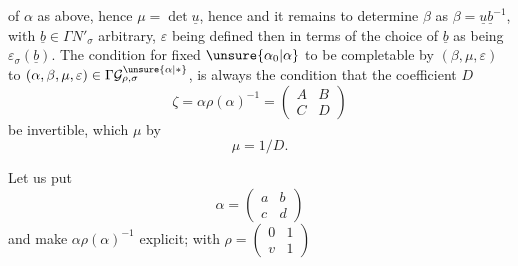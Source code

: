 of $\alpha$ as above, hence $\mu=\det\underline u$, hence
and it  
remains to determine $\beta$ as
$\beta=\underline u\underline b^{-1}$, with $\underline b\in\Gamma N'_\sigma$
arbitrary, $\varepsilon$ being defined then in terms of the choice of $\underline b$
as being $\varepsilon_\sigma(\underline b)$. The condition for
fixed $\unsure{\alpha_0|\alpha}$ to be completable by $(\beta,\mu,\varepsilon)$
to $(\alpha,\beta,\mu,\varepsilon)\in\Gamma\mathcal G^{\unsure{\alpha|*}}_{\rho,\sigma}$,
is always the condition that the coefficient $D$ 
\[
\tag{33}
\zeta=\alpha\rho(\alpha)^{-1}=\begin{pmatrix}A&B\\C&D\end{pmatrix}
\]
be invertible, which   $\mu$ by
\[
\tag{34}
\mu=1/D.
\]

Let us put
\[
\tag{35}
\alpha=\begin{pmatrix}a&b\\c&d\end{pmatrix}
\]
and make $\alpha\rho(\alpha)^{-1}$ explicit; with
$\rho=\begin{pmatrix}0&1\\v&1\end{pmatrix}$

